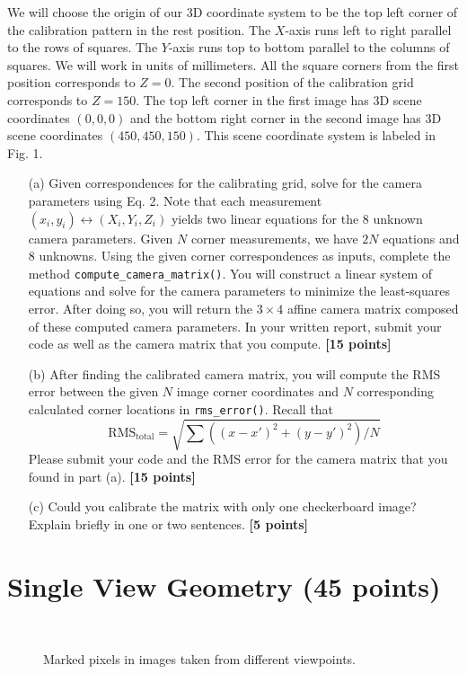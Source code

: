 We will choose the origin of our 3D coordinate system to be the top left corner of the calibration pattern
in the rest position. The $X$-axis runs left to right parallel to the rows of squares. The $Y$-axis runs top to
bottom parallel to the columns of squares. We will work in units of millimeters. All the square corners from
the first position corresponds to $Z = 0$. The second position of the calibration grid corresponds to $Z =150$.  The top left corner in the first image has 3D scene
coordinates $(0,0,0)$ and the bottom right corner in the second image has 3D scene coordinates $(450,450,150)$. This scene coordinate system is labeled in Fig. 1.

\begin{itemize}
  \item[(a)] Given correspondences for the calibrating grid, solve for the camera parameters using Eq. 2. Note that each measurement $(x_i , y_i )  \leftrightarrow (X_i , Y_i , Z_i )$ yields two linear equations for the 8 unknown camera parameters. Given $N$ corner measurements, we have $2N$ equations and 8 unknowns. Using the given corner correspondences as inputs, complete the method \texttt{compute\_camera\_matrix()}. You will construct a linear system of equations and solve for the camera parameters to minimize the least-squares error. After doing so, you will return the $3\times4$ affine camera matrix composed of these computed camera parameters. In your written report, submit your code as well as the camera matrix that you compute. {\bf [15 points]}

  \item[(b)] After finding the calibrated camera matrix, you will compute the RMS error between the given $N$ image corner coordinates and $N$ corresponding calculated corner locations in \texttt{rms\_error()}.  Recall that \[\mathrm{RMS}_\mathrm{total}=\sqrt{ \sum ((x-x')^2 + (y-y')^2)/N}\]
  Please submit your code and the RMS error for the camera matrix that you found in part (a). {\bf [15 points]}

	\item[(c)] Could you calibrate the matrix with only one checkerboard image? Explain briefly in one or two sentences. {\bf [5 points]}


\end{itemize}


\section{Single View Geometry (45 points)}
\begin{figure}[h!]
	\centering
	 \
	\label{fig:singleView}
  \caption{Marked pixels in images taken from different viewpoints.}
\end{figure}

